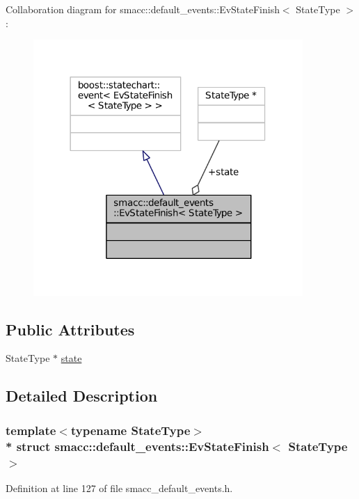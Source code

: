 Collaboration diagram for smacc\+:\+:default\+\_\+events\+:\+:Ev\+State\+Finish$<$ State\+Type $>$\+:
\nopagebreak
\begin{figure}[H]
\begin{center}
\leavevmode
\includegraphics[width=290pt]{structsmacc_1_1default__events_1_1EvStateFinish__coll__graph}
\end{center}
\end{figure}
\subsection*{Public Attributes}
\begin{DoxyCompactItemize}
\item 
State\+Type $\ast$ \hyperlink{structsmacc_1_1default__events_1_1EvStateFinish_ad598cccf2b8ddb507f3c0efba2232d62}{state}
\end{DoxyCompactItemize}


\subsection{Detailed Description}
\subsubsection*{template$<$typename State\+Type$>$\\*
struct smacc\+::default\+\_\+events\+::\+Ev\+State\+Finish$<$ State\+Type $>$}



Definition at line 127 of file smacc\+\_\+default\+\_\+events.\+h.



